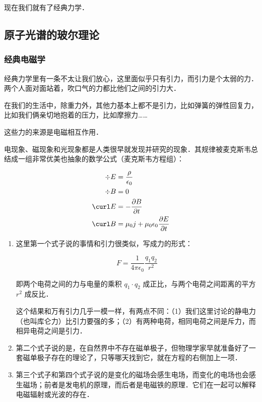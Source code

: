 现在我们就有了经典力学．

\subsection{原子光谱的玻尔理论}

\subsubsection{经典电磁学}

经典力学里有一条不太让我们放心，这里面似乎只有引力，而引力是个太弱的力．两个人面对面站着，吹口气的力都比他们之间的引力大．

在我们的生活中，除重力外，其他力基本上都不是引力，比如弹簧的弹性回复力，比如我们俩亲切地抱着的压力，比如摩擦力……

这些力的来源是电磁相互作用．

电现象、磁现象和光现象都是人类很早就发现并研究的现象．其规律被麦克斯韦总结成一组非常优美也抽象的数学公式（麦克斯韦方程组）：

\begin{equation}
\begin{aligned}
\div E & = \frac{\rho}{ \epsilon_0}\\
\div B & = 0 \\
\curl E & = - \frac{\partial B}{\partial t} \\
\curl B & = \mu_0 j + \mu_0 \epsilon_0 \frac{\partial E}{\partial t}
\end{aligned}
\end{equation}


\begin{enumerate}
\item 

这里第一个式子说的事情和引力很类似，写成力的形式：

\begin{equation}
F = \frac{1}{4 \pi \epsilon_0} \frac{q_1 q_2}{r^2}
\end{equation}

即两个电荷之间的力与电量的乘积 $q_1 \cdot q_2$ 成正比，与两个电荷之间距离的平方 $r^2$ 成反比．

这个结果和万有引力几乎一模一样，有两点不同：（1）我们这里讨论的静电力（也叫库仑力）比引力要强的多；（2）有两种电荷，相同电荷之间是斥力，而相异电荷之间是引力．

\item

第二个式子说的是，在自然界中不存在磁单极子，但物理学家早就准备好了一套磁单极子存在的理论了，只等哪天找到它，就在方程的右侧加上一项．

\item

第三个式子和第四个式子说的是变化的磁场会感生电场，而变化的电场也会感生磁场；前者是发电机的原理，而后者是电磁铁的原理．它们在一起可以解释电磁辐射或光波的存在．

\end{enumerate}

